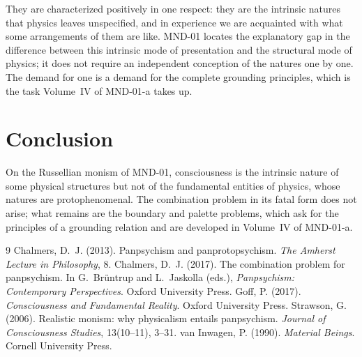 \documentclass{situationist-preprint}
\begin{document}
\begin{reply}
They are characterized positively in one respect: they are the intrinsic natures that physics leaves unspecified, and in experience we are acquainted with what some arrangements of them are like. MND-01 locates the explanatory gap in the difference between this intrinsic mode of presentation and the structural mode of physics; it does not require an independent conception of the natures one by one. The demand for one is a demand for the complete grounding principles, which is the task Volume~IV of MND-01-a takes up.
\end{reply}

\section{Conclusion}

On the Russellian monism of MND-01, consciousness is the intrinsic nature of some physical structures but not of the fundamental entities of physics, whose natures are protophenomenal. The combination problem in its fatal form does not arise; what remains are the boundary and palette problems, which ask for the principles of a grounding relation and are developed in Volume~IV of MND-01-a.

\begin{thebibliography}{9}\small
{} Chalmers, D.~J. (2013). Panpsychism and panprotopsychism. \emph{The Amherst Lecture in Philosophy}, 8.
 Chalmers, D.~J. (2017). The combination problem for panpsychism. In G.~Br\"untrup and L.~Jaskolla (eds.), \emph{Panpsychism: Contemporary Perspectives}. Oxford University Press.
 Goff, P. (2017). \emph{Consciousness and Fundamental Reality}. Oxford University Press.
 Strawson, G. (2006). Realistic monism: why physicalism entails panpsychism. \emph{Journal of Consciousness Studies}, 13(10--11), 3--31.
 van Inwagen, P. (1990). \emph{Material Beings}. Cornell University Press.
\end{thebibliography}
\end{document}
